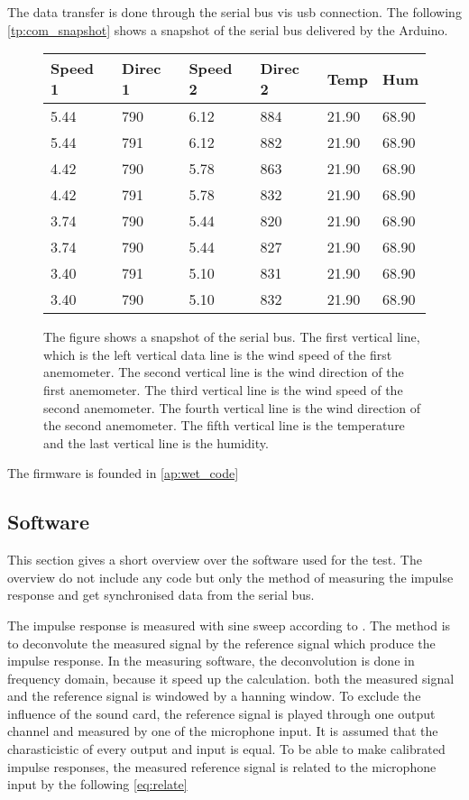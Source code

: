 The data transfer is done through the serial bus vis \gls{usb} connection. The following \autoref{tp:com_snapshot} shows a snapshot of the serial bus delivered by the Arduino.


\begin{figure}[H]
\centering
	  \captionsetup{width=0.57\linewidth}
	  \footnotesize
\begin{tabular}{llllll}
Speed 1 & Direc 1 & Speed 2 & Direc 2 & Temp  & Hum   \\ \hline
5.44    & 790     & 6.12    & 884     & 21.90 & 68.90 \\
5.44    & 791     & 6.12    & 882     & 21.90 & 68.90 \\
4.42    & 790     & 5.78    & 863     & 21.90 & 68.90 \\
4.42    & 791     & 5.78    & 832     & 21.90 & 68.90 \\
3.74    & 790     & 5.44    & 820     & 21.90 & 68.90 \\
3.74    & 790     & 5.44    & 827     & 21.90 & 68.90 \\
3.40    & 791     & 5.10    & 831     & 21.90 & 68.90 \\
3.40    & 790     & 5.10    & 832     & 21.90 & 68.90
\end{tabular}
\caption{The figure shows a snapshot of the serial bus. The first vertical line, which is the left vertical data line is the wind speed of the first anemometer.  The second vertical line is the wind direction of the first anemometer. The third vertical line is the wind speed of the second anemometer.  The fourth vertical line is the wind direction of the second anemometer. The fifth vertical line is the temperature and the last vertical line is the humidity.}
\label{tp:com_snapshot}
\end{figure}%


The firmware is founded in \autoref{ap:wet_code}

\subsection{Software}
This section gives a short overview over the \matlab software used for the test. The overview do not include any code but only the method of measuring the impulse response and get synchronised data from the serial bus. 

The impulse response is measured with sine sweep according to \citep{}. The method is to deconvolute the measured signal by the reference signal which produce the impulse response. In the measuring software, the deconvolution is done in frequency domain, because it speed up the calculation. both the measured signal and the reference signal is windowed by a hanning window. To exclude the influence of the sound card, the reference signal is played through one output channel and measured by one of the microphone input. It is assumed that the charasticistic of every output and input is equal. To be able to make calibrated impulse responses, the measured reference signal is related to the microphone input by the following \autoref{eq:relate}


